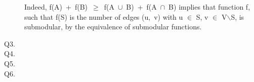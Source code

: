 \documentclass[10pt]{csc_assignment}
\begin{document}
\begin{description}
Indeed, \mbox{f(A) + f(B) $\geqslant$ f(A $\cup$ B) + f(A $\cap$ B)} implies that function f,
such that f(S) is the number of edges \mbox{(u, v)} with u $\in$ S, v $\in$ V$\backslash$S, is 
submodular, by the equivalence of submodular functions.
 


\newpage
\item[Q3.]


\newpage
\item[Q4.]
    

\newpage
\item[Q5.]



\newpage
\item[Q6.]


\end{description}
\end{document}
